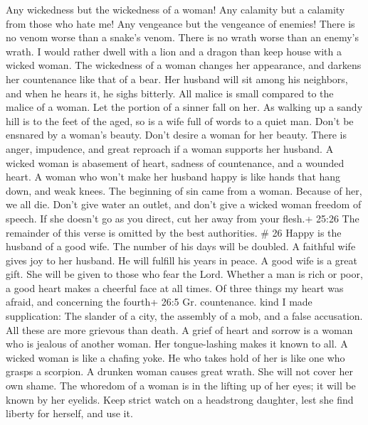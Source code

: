 Any wickedness but the wickedness of a woman!  Any calamity
but a calamity from those who hate me! Any vengeance but the vengeance
of enemies!  There is no venom worse than a snake's venom.
There is no wrath worse than an enemy's wrath.  I would
rather dwell with a lion and a dragon than keep house with a wicked
woman.  The wickedness of a woman changes her appearance,
and darkens her countenance like that of a bear.  Her
husband will sit among his neighbors, and when he hears it, he sighs
bitterly.  All malice is small compared to the malice of a
woman. Let the portion of a sinner fall on her.  As walking
up a sandy hill is to the feet of the aged, so is a wife full of words
to a quiet man.  Don't be ensnared by a woman's beauty.
Don't desire a woman for her beauty.  There is anger,
impudence, and great reproach if a woman supports her husband.
 A wicked woman is abasement of heart, sadness of
countenance, and a wounded heart. A woman who won't make her husband
happy is like hands that hang down, and weak knees.  The
beginning of sin came from a woman. Because of her, we all die.
 Don't give water an outlet, and don't give a wicked woman
freedom of speech.  If she doesn't go as you direct, cut
her away from your flesh.+ 25:26 The remainder of this verse is omitted
by the best authorities. \# 26  Happy is the husband of a
good wife. The number of his days will be doubled.  A
faithful wife gives joy to her husband. He will fulfill his years in
peace.  A good wife is a great gift. She will be given to
those who fear the Lord.  Whether a man is rich or poor, a
good heart makes a cheerful face at all times.  Of three
things my heart was afraid, and concerning the fourth+ 26:5 Gr.
countenance. kind I made supplication: The slander of a city, the
assembly of a mob, and a false accusation. All these are more grievous
than death.  A grief of heart and sorrow is a woman who is
jealous of another woman. Her tongue-lashing makes it known to all.
 A wicked woman is like a chafing yoke. He who takes hold of
her is like one who grasps a scorpion.  A drunken woman
causes great wrath. She will not cover her own shame.  The
whoredom of a woman is in the lifting up of her eyes; it will be known
by her eyelids.  Keep strict watch on a headstrong
daughter, lest she find liberty for herself, and use it. 
